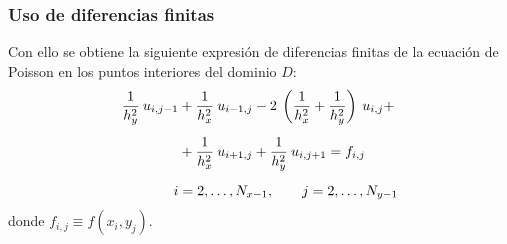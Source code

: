 \begin{frame}
\frametitle{Uso de diferencias finitas}
Con ello se obtiene la siguiente expresión de diferencias finitas de la ecuación de Poisson en los puntos interiores del dominio $D$:
\begin{align}
\begin{aligned}
\dfrac{1}{h_{y}^{2}} \: u_{i, j-1} &+ \dfrac{1}{h_{x}^{2}} \: u_{i-1, j} - 2 \: \left( \dfrac{1}{h_{x}^{2}} + \dfrac{1}{h_{y}^{2}} \right) \: u_{i, j} + \\[0.5em]
&+ \dfrac{1}{h_{x}^{2}} \: u_{i+1, j} + \dfrac{1}{h_{y}^{2}} \: u_{i, j+1} = f_{i, j} \\[0.5em]
i &= 2, \ldots, N_{x-1}, \hspace{0.7cm} j = 2, \ldots, N_{y-1}
\end{aligned}
\label{eq:ecuacion_13_06}
\end{align}
donde $f_{i, j} \equiv f(x_{i}, y_{j})$.
\end{frame}
